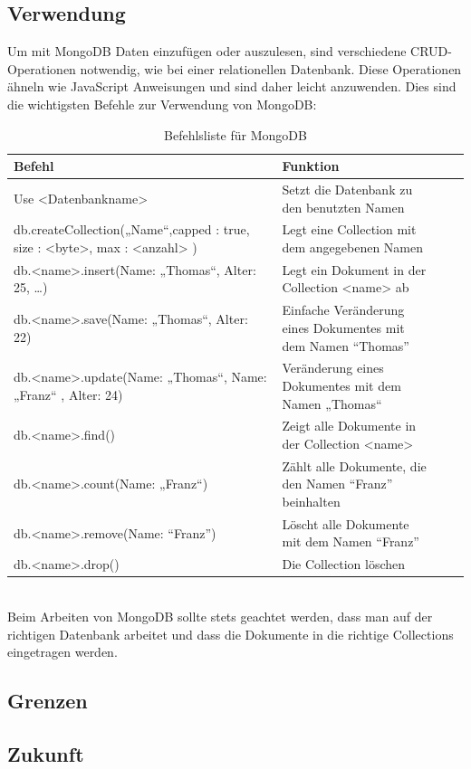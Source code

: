 \subsection{Verwendung}
Um mit MongoDB Daten einzufügen oder auszulesen, sind verschiedene CRUD-Operationen notwendig, wie bei einer relationellen Datenbank. Diese Operationen ähneln wie JavaScript Anweisungen und sind daher leicht anzuwenden. Dies sind die wichtigsten Befehle zur Verwendung von MongoDB:
\\
\begin{table}
\centering
\begin{tabular}{p{7cm}|p{7cm}|c|c|}
\hline 
Befehl & Funktion \\ 
\hline 
Use <Datenbankname> & Setzt die Datenbank zu den benutzten Namen \\ 
\hline 
db.createCollection(„Name“,{capped : true, size : <byte>, max : <anzahl> }) & Legt eine Collection mit dem angegebenen Namen \\ 
\hline 
db.<name>.insert({Name: „Thomas“, Alter: 25, …})  & Legt ein Dokument in der Collection <name> ab \\ 
\hline 
db.<name>.save({Name: „Thomas“, Alter: 22}) & Einfache Veränderung eines Dokumentes mit dem Namen “Thomas” \\ 
\hline 
db.<name>.update({Name: „Thomas“}, {Name: „Franz“ , Alter: 24}) & Veränderung eines Dokumentes mit dem Namen „Thomas“ \\ 
\hline 
db.<name>.find() & Zeigt alle Dokumente in der Collection <name> \\ 
\hline 
db.<name>.count({Name: „Franz“}) & Zählt alle Dokumente, die den Namen “Franz” beinhalten \\ 
\hline 
db.<name>.remove({Name: “Franz”}) & Löscht alle Dokumente mit dem Namen “Franz” \\ 
\hline 
db.<name>.drop() & Die Collection löschen \\ 
\hline 
\end{tabular}
\caption{Befehlsliste für MongoDB}
\end{table} 
\\
Beim Arbeiten von MongoDB sollte stets geachtet werden, dass man auf der richtigen Datenbank arbeitet und dass die Dokumente in die richtige Collections eingetragen werden. 
\subsection{Grenzen}
\subsection{Zukunft}